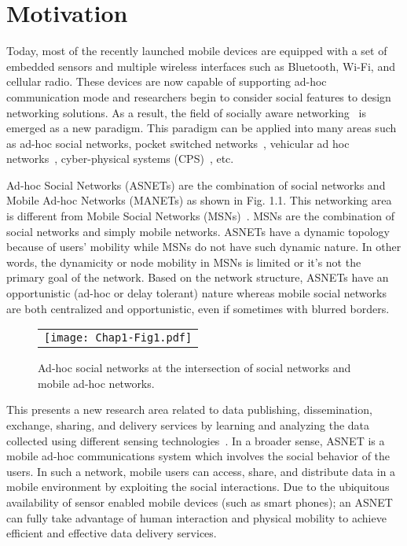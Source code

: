 \section{Motivation}\label{Chap1_01}

Today, most of the recently launched mobile devices are equipped with a set of embedded sensors and multiple wireless interfaces such as Bluetooth, Wi-Fi, and cellular radio. These devices are now capable of supporting ad-hoc communication mode and researchers begin to consider social features to design networking solutions. As a result, the field of socially aware networking~\cite{FXia2013} is emerged as a new paradigm. This paradigm can be applied into many areas such as ad-hoc social networks, pocket switched networks~\cite{SWang2012}, vehicular ad hoc networks~\cite{WChen2008}, cyber-physical systems (CPS)~\cite{FJWu2011}, etc.

Ad-hoc Social Networks (ASNETs) are the combination of social networks and Mobile Ad-hoc Networks (MANETs) as shown in Fig. 1.1. This networking area is different from Mobile Social Networks (MSNs)~\cite{NKayastha2012}. MSNs are the combination of social networks and simply mobile networks. ASNETs have a dynamic topology because of users' mobility while MSNs do not have such dynamic nature. In other words, the dynamicity or node mobility in MSNs is limited or it's not the primary goal of the network. Based on the network structure, ASNETs have an opportunistic (ad-hoc or delay tolerant) nature whereas mobile social networks are both centralized and opportunistic, even if sometimes with blurred borders.
\begin{figure}[b]
\begin{center}
  \begin{tabular}{c}
  \texttt{[image: Chap1-Fig1.pdf]}
  \end{tabular}
  \caption{Ad-hoc social networks at the intersection of social networks and mobile ad-hoc networks.}
\end{center}
\end{figure}

This presents a new research area related to data publishing, dissemination, exchange, sharing, and delivery services by learning and analyzing the data collected using different sensing technologies~\cite{RKGanti2011}. In a broader sense, ASNET is a mobile ad-hoc communications system which involves the social behavior of the users. In such a network, mobile users can access, share, and distribute data in a mobile environment by exploiting the social interactions. Due to the ubiquitous availability of sensor enabled mobile devices (such as smart phones); an ASNET can fully take advantage of human interaction and physical mobility to achieve efficient and effective data delivery services.

